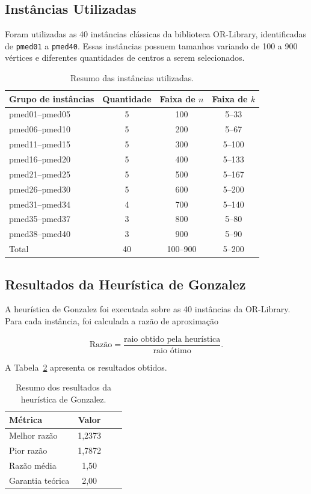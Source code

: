 \documentclass[12pt]{article}
\begin{document}
\subsection{Instâncias Utilizadas}

Foram utilizadas as 40 instâncias clássicas da biblioteca OR-Library, identificadas de \texttt{pmed01} a \texttt{pmed40}. Essas instâncias possuem tamanhos variando de 100 a 900 vértices e diferentes quantidades de centros a serem selecionados.

\begin{table}[H]
\centering
\caption{Resumo das instâncias utilizadas.}
\begin{tabular}{lccc}
\hline
Grupo de instâncias & Quantidade & Faixa de $n$ & Faixa de $k$ \\
\hline
pmed01--pmed05 & 5 & 100 & 5--33 \\
pmed06--pmed10 & 5 & 200 & 5--67 \\
pmed11--pmed15 & 5 & 300 & 5--100 \\
pmed16--pmed20 & 5 & 400 & 5--133 \\
pmed21--pmed25 & 5 & 500 & 5--167 \\
pmed26--pmed30 & 5 & 600 & 5--200 \\
pmed31--pmed34 & 4 & 700 & 5--140 \\
pmed35--pmed37 & 3 & 800 & 5--80 \\
pmed38--pmed40 & 3 & 900 & 5--90 \\
\hline
Total & 40 & 100--900 & 5--200 \\
\hline
\end{tabular}
\label{tab:instancias}
\end{table}

\subsection{Resultados da Heurística de Gonzalez}

A heurística de Gonzalez foi executada sobre as 40 instâncias da OR-Library. Para cada instância, foi calculada a razão de aproximação

\[
\text{Razão} = \frac{\text{raio obtido pela heurística}}{\text{raio ótimo}}.
\]

A Tabela~\ref{tab:gonzalez} apresenta os resultados obtidos.

\begin{table}[h]
\centering
\caption{Resumo dos resultados da heurística de Gonzalez.}
\begin{tabular}{lccc}
\hline
Métrica & Valor \\
\hline
Melhor razão & 1,2373 \\
Pior razão & 1,7872 \\
Razão média & 1,50 \\
Garantia teórica & 2,00 \\
\hline
\end{tabular}
\label{tab:gonzalez}
\end{table}
\end{document}
